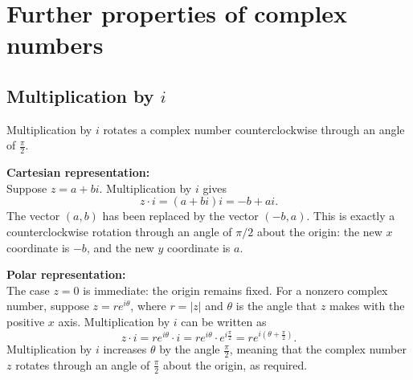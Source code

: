 

\Needspace{0.47\textheight}
\section{Further properties of complex numbers}
\subsection{Multiplication by $i$}
Multiplication by $i$ rotates a complex number counterclockwise through an angle of \( \frac{\pi}{2} \).

{

\textbf{Cartesian representation:}\\
Suppose \( z = a + bi \). Multiplication by $i$ gives
\[
z \cdot i = (a + bi)i = -b + ai.
\]
The vector $(a,b)$ has been replaced by the vector $(-b,a)$. This is exactly a counterclockwise rotation through an angle of $\pi/2$ about the origin: the new $x$ coordinate is $-b$, and the new $y$ coordinate is $a$.

\textbf{Polar representation:}\\
The case $z=0$ is immediate: the origin remains fixed. For a nonzero complex number, suppose \( z = r e^{i\theta} \), where \( r = |z| \) and \( \theta \) is the angle that \( z \) makes with the positive \( x \) axis. Multiplication by $i$ can be written as
\[
z \cdot i = r e^{i\theta} \cdot i = r e^{i\theta} \cdot e^{i\frac{\pi}{2}} = r e^{i(\theta + \frac{\pi}{2})}.
\]
Multiplication by $i$ increases \( \theta \) by the angle \( \frac{\pi}{2} \), meaning that the complex number \( z \) rotates through an angle of \( \frac{\pi}{2} \) about the origin, as required.
}
